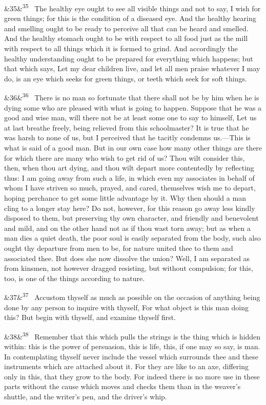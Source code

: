 \documentclass[12pt]{article}
\newcommand{\para}[1][]{\par\noindent\ifx&#1&\else\textsuperscript{\footnotesize #1}~\fi}
\begin{document}
\para[35] The healthy eye ought to see all visible things and not to say, I
wish for green things; for this is the condition of a diseased eye. And
the healthy hearing and smelling ought to be ready to perceive all that
can be heard and smelled. And the healthy stomach ought to be with
respect to all food just as the mill with respect to all things which it
is formed to grind. And accordingly the healthy understanding ought to
be prepared for everything which happens; but that which says, Let my
dear children live, and let all men praise whatever I may do, is an eye
which seeks for green things, or teeth which seek for soft things.

\para[36] There is no man so fortunate that there shall not be by him when he
is dying some who are pleased with what is going to happen. Suppose
that he was a good and wise man, will there not be at least some one to
say to himself, Let us at last breathe freely, being relieved from this
schoolmaster? It is true that he was harsh to none of us, but I
perceived that he tacitly condemns us.---This is what is said of a good
man. But in our own case how many other things are there for which there
are many who wish to get rid of us? Thou wilt consider this, then, when
thou art dying, and thou wilt depart more contentedly by reflecting
thus: I am going away from such a life, in which even my associates in
behalf of whom I have striven so much, prayed, and cared, themselves
wish me to depart, hoping perchance to get some little advantage by it.
Why then should a man cling to a longer stay here? Do not, however, for
this reason go away less kindly disposed to them, but preserving thy own
character, and friendly and benevolent and mild, and on the other hand
not as if thou wast torn away; but as when a man dies a quiet death, the
poor soul is easily separated from the body, such also ought thy
departure from men to be, for nature united thee to them and associated
thee. But does she now dissolve the union? Well, I am separated as from
kinsmen, not however dragged resisting, but without compulsion; for
this, too, is one of the things according to nature.

\para[37] Accustom thyself as much as possible on the occasion of anything
being done by any person to inquire with thyself, For what object is
this man doing this? But begin with thyself, and examine thyself first.

\para[38] Remember that this which pulls the strings is the thing which is
hidden within: this is the power of persuasion, this is life, this, if
one may so say, is man. In contemplating thyself never include the
vessel which surrounds thee and these instruments which are attached
about it. For they are like to an axe, differing only in this, that they
grow to the body. For indeed there is no more use in these parts without
the cause which moves and checks them than in the weaver's shuttle, and
the writer's pen, and the driver's whip.
\end{document}
